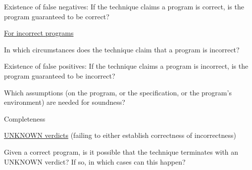 \documentclass[a4paper]{article}
\begin{document}
\begin{minipage}[t]{0.16\linewidth}
\begin{betterlist}
\begin{betterlist}
\begin{betterlist}
				\item Existence of false negatives: If the technique claims a program is correct, is the program guaranteed to be correct?

			\end{betterlist}
			\item \underline{For incorrect programs}
			\begin{betterlist}
				\item In which circumstances does the technique claim that a program is incorrect?

				\item Existence of false positives: If the technique claims a program is incorrect, is the program guaranteed to be incorrect?

			\end{betterlist}
			\item Which assumptions (on the program, or the specification, or the program’s environment) are needed for soundness?
			\framebox[0.95\textwidth][l]{\parbox{0.90\textwidth}{
					-
				}}
		\end{betterlist}
		\item \alert{Completeness}
		\begin{betterlist}
			\item \underline{UNKNOWN verdicts} (failing to either establish correctness of incorrectness)
			\begin{betterlist}
				\item Given a correct program, is it possible that the technique terminates with an UNKNOWN verdict? If so, in which cases can this happen?


\end{betterlist}
\end{betterlist}
\end{betterlist}
\end{minipage}
\end{document}
